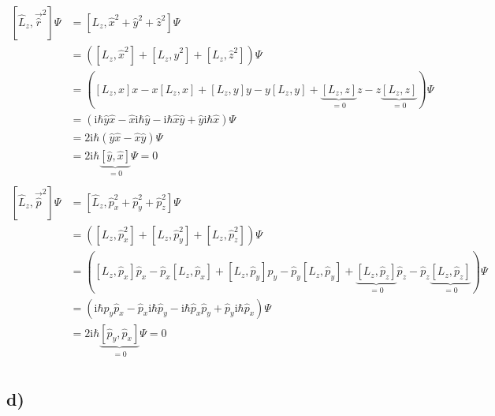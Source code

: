     \begin{align*}
        \left[ \hat{L}_z,\vec{\hat{r}}^2 \right] \Psi &= [L_z, \hat x ^2 + \hat y ^2 + \hat z ^2] \Psi \\
        &= ([L_z, \hat x ^2 ] + [L_z, \hat y ^2 ] + [L_z, \hat z ^2 ]) \Psi \\
        &= \left( \left[ L_z,x \right]x - x\left[ L_z,x \right] + \left[ L_z,y \right]y - y\left[ L_z,y \right] + \underbrace{\left[ L_z,z \right]}_{=0}z - z\underbrace{\left[ L_z,z \right]}_{=0}\right) \Psi\\
        &= \left( \text{i}\hbar \hat{y}\hat{x} - \hat{x}\text{i}\hbar\hat{y} - \text{i}\hbar \hat{x}\hat{y} + \hat{y}\text{i}\hbar\hat{x} \right) \Psi\\
        &= 2\text{i}\hbar \left( \hat{y}\hat{x}-\hat{x}\hat{y} \right) \Psi\\
        &= 2\text{i}\hbar \underbrace{\left[ \hat{y},\hat{x} \right]}_{=0} \Psi = 0\\
        \\
        \left[ \hat{L}_z,\vec{\hat{p}}^2 \right] \Psi &= [\hat L _z , \hat p _x ^2 + \hat p _y^2 + \hat p _z^2 ] \Psi\\
        &= \left( \left[ L_z,\hat{p}_x ^2 \right] + \left[ L_z,\hat{p}_y ^2 \right] + \left[ L_z,\hat{p}_z ^2 \right] \right)\Psi\\
        &= \left( \left[ L_z,\hat{p}_x \right]\hat{p}_x - \hat{p}_x\left[ L_z,\hat{p}_x \right] + \left[ L_z,\hat{p}_y \right]\hat{p}_y - \hat{p}_y\left[ L_z,\hat{p}_y \right] + \underbrace{\left[ L_z,\hat{p}_z \right]}_{=0}\hat{p}_z - \hat{p}_z\underbrace{\left[ L_z,\hat{p}_z \right]}_{=0}\right) \Psi\\
        &= \left( \text{i}\hbar \hat{p}_y\hat{p}_x - \hat{p}_x\text{i}\hbar\hat{p}_y - \text{i}\hbar \hat{p}_x\hat{p}_y + \hat{p}_y\text{i}\hbar\hat{p}_x \right) \Psi\\
        &= 2\text{i}\hbar \underbrace{\left[ \hat{p}_y,\hat p _x \right]}_{=0} \Psi = 0\\
    \end{align*}

    \subsection{d)}





